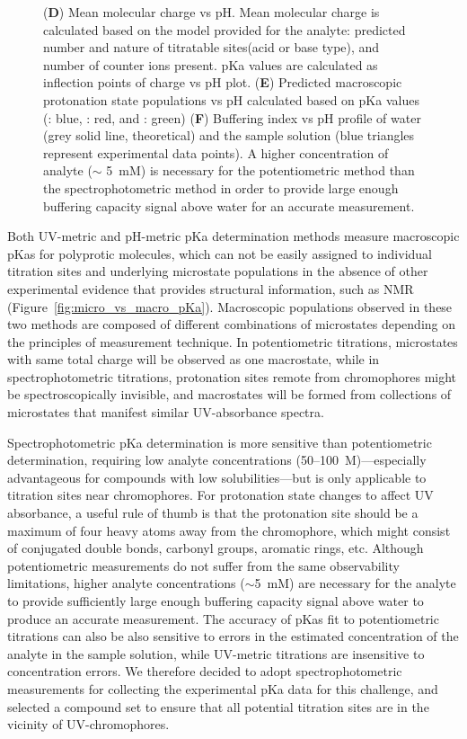 \documentclass[9pt,lineno]{elife}
\begin{document}
\begin{figure}
{(\textbf{D}) Mean molecular charge vs pH. 
Mean molecular charge is calculated based on the model provided for the analyte: predicted number and nature of titratable sites(acid or base type), and number of counter ions present. pKa values are calculated as inflection points of charge vs pH plot. 
(\textbf{E}) Predicted macroscopic protonation state populations vs pH calculated based on pKa values (: blue, : red, and : green) 
(\textbf{F}) Buffering index vs pH profile of water (grey solid line, theoretical) and the sample solution (blue triangles represent experimental data points). 
A higher concentration of analyte ($\sim$ 5~mM) is necessary for the potentiometric method than the spectrophotometric method in order to provide large enough buffering capacity signal above water for an accurate measurement. 
}
\label{fig:UVmetric_vs_pHmetric_pKa}
\end{figure}

Both UV-metric and pH-metric pKa determination methods measure macroscopic pKas for polyprotic molecules, which can not be easily assigned to individual titration sites and underlying microstate populations in the absence of other experimental evidence that provides structural information, such as NMR (Figure~\ref{fig:micro_vs_macro_pKa}). Macroscopic populations observed in these two methods are composed of different combinations of microstates depending on the principles of measurement technique. 
In potentiometric titrations, microstates with same total charge will be observed as one macrostate, while in spectrophotometric titrations, protonation sites remote from chromophores might be spectroscopically invisible, and macrostates will be formed from collections of microstates that manifest similar UV-absorbance spectra.

Spectrophotometric pKa determination is more sensitive than potentiometric determination, requiring low analyte concentrations (50--100~{\micro}M)---especially advantageous for compounds with low solubilities---but is only applicable to titration sites near chromophores. 
For protonation state changes to affect UV absorbance, a useful rule of thumb is that the protonation site should be a maximum of four heavy atoms away from the chromophore, which might consist of conjugated double bonds, carbonyl groups, aromatic rings, etc.
Although potentiometric measurements do not suffer from the same observability limitations, higher analyte concentrations ($\sim$5~mM) are necessary for the analyte to provide sufficiently large enough buffering capacity signal above water to produce an accurate measurement. 
The accuracy of pKas fit to potentiometric titrations can also be also sensitive to errors in the estimated concentration of the analyte in the sample solution, while UV-metric titrations are insensitive to concentration errors.
We therefore decided to adopt spectrophotometric measurements for collecting the experimental pKa data for this challenge, and selected a compound set to ensure that all potential titration sites are in the vicinity of UV-chromophores.
\end{document}
